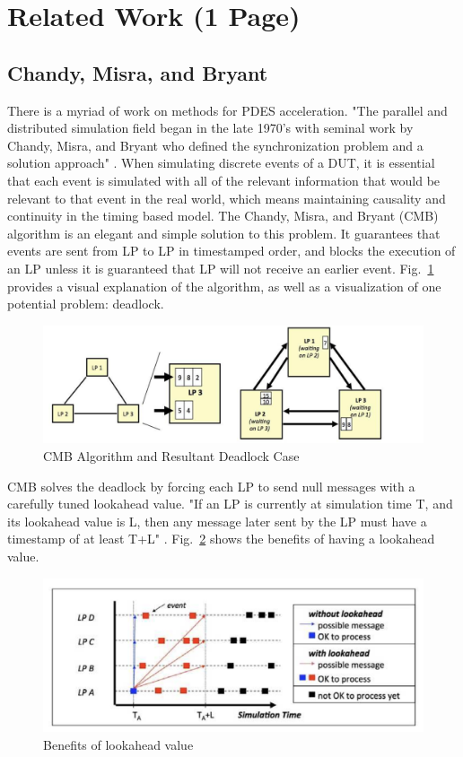 \documentclass[conference]{IEEEtran}
\begin{document}
\section{Related Work (1 Page)}
\subsection{Chandy, Misra, and Bryant}
There is a myriad of work on methods for PDES acceleration. "The parallel and distributed simulation field began in the late 1970’s with seminal work by Chandy, Misra, and Bryant who defined the synchronization problem and a solution approach" \cite{b2}. When simulating discrete events of a DUT, it is essential that each event is simulated with all of the relevant information that would be relevant to that event in the real world, which means maintaining causality and continuity in the timing based model. The Chandy, Misra, and Bryant (CMB) algorithm is an elegant and simple solution to this problem. It guarantees that events are sent from LP to LP in timestamped order, and blocks the execution of an LP unless it is guaranteed that LP will not receive an earlier event. Fig.~\ref{cmb_deadlock} provides a visual explanation of the algorithm, as well as a visualization of one potential problem: deadlock.

\begin{figure}[htbp]
\centerline{\includegraphics[width=\linewidth]{./images/cmb_deadlock.png}}
\caption{CMB Algorithm and Resultant Deadlock Case\cite{b2}}
\label{cmb_deadlock}
\end{figure}

CMB solves the deadlock by forcing each LP to send null messages with a carefully tuned lookahead value. "If an LP is currently at simulation time T, and its lookahead value is L, then any message later sent by the LP must have a timestamp of at least T+L" \cite{b2}. Fig.~\ref{lookahead} shows the benefits of having a lookahead value.

\begin{figure}[htbp]
\centerline{\includegraphics[width=\linewidth]{./images/lookahead.png}}
\caption{Benefits of lookahead value \cite{b2}}
\label{lookahead}
\end{figure}
\end{document}
